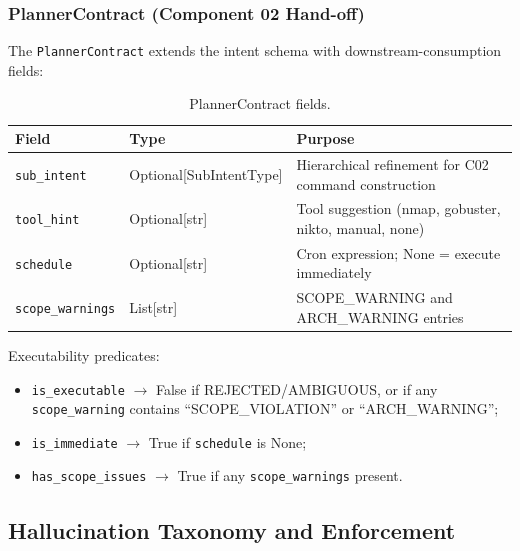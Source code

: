 ﻿\documentclass[10pt,journal,onecolumn]{IEEEtran}
\begin{document}
\subsubsection{PlannerContract (Component 02 Hand-off)}
The \texttt{PlannerContract} extends the intent schema with downstream-consumption fields:
\begin{table}[h]
\caption{PlannerContract fields.}
\label{tab:plannercontract}
\begin{tabularx}{\columnwidth}{>{\ttfamily}l l X}
\toprule
\textbf{Field} & \textbf{Type} & \textbf{Purpose}\\
\midrule
\texttt{sub\_intent} & Optional[SubIntentType] & Hierarchical refinement for C02 command construction\\
\texttt{tool\_hint} & Optional[str] & Tool suggestion (nmap, gobuster, nikto, manual, none)\\
\texttt{schedule} & Optional[str] & Cron expression; None = execute immediately\\
\texttt{scope\_warnings} & List[str] & SCOPE\_WARNING and ARCH\_WARNING entries\\
\bottomrule
\end{tabularx}
\end{table}

Executability predicates:
\begin{itemize}
\item \texttt{is\_executable} $\rightarrow$ False if REJECTED/AMBIGUOUS, or if any \texttt{scope\_warning} contains ``SCOPE\_VIOLATION'' or ``ARCH\_WARNING'';
\item \texttt{is\_immediate} $\rightarrow$ True if \texttt{schedule} is None;
\item \texttt{has\_scope\_issues} $\rightarrow$ True if any \texttt{scope\_warnings} present.
\end{itemize}

\subsection{Hallucination Taxonomy and Enforcement}
\end{document}
